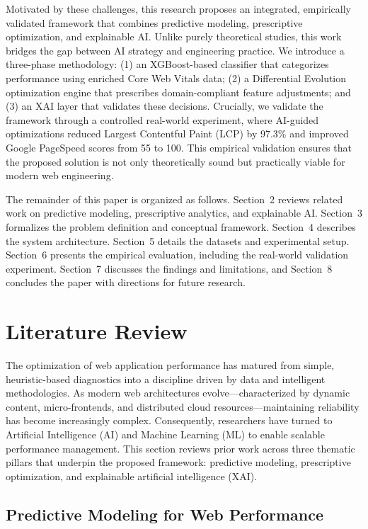 \documentclass[sn-nature]{sn-jnl}
\begin{document}
Motivated by these challenges, this research proposes an integrated, empirically validated framework that combines predictive modeling, prescriptive optimization, and explainable AI. Unlike purely theoretical studies, this work bridges the gap between AI strategy and engineering practice. We introduce a three-phase methodology: (1) an XGBoost-based classifier that categorizes performance using enriched Core Web Vitals data; (2) a Differential Evolution optimization engine that prescribes domain-compliant feature adjustments; and (3) an XAI layer that validates these decisions. Crucially, we validate the framework through a controlled real-world experiment, where AI-guided optimizations reduced Largest Contentful Paint (LCP) by 97.3\% and improved Google PageSpeed scores from 55 to 100. This empirical validation ensures that the proposed solution is not only theoretically sound but practically viable for modern web engineering.

The remainder of this paper is organized as follows. Section~2 reviews related work on predictive modeling, prescriptive analytics, and explainable AI. Section~3 formalizes the problem definition and conceptual framework. Section~4 describes the system architecture. Section~5 details the datasets and experimental setup. Section~6 presents the empirical evaluation, including the real-world validation experiment. Section~7 discusses the findings and limitations, and Section~8 concludes the paper with directions for future research.


\section{Literature Review}\label{sec2}

The optimization of web application performance has matured from simple, heuristic-based diagnostics into a discipline driven by data and intelligent methodologies. As modern web architectures evolve—characterized by dynamic content, micro-frontends, and distributed cloud resources—maintaining reliability has become increasingly complex. Consequently, researchers have turned to Artificial Intelligence (AI) and Machine Learning (ML) to enable scalable performance management. This section reviews prior work across three thematic pillars that underpin the proposed framework: predictive modeling, prescriptive optimization, and explainable artificial intelligence (XAI).

\subsection{Predictive Modeling for Web Performance}
\end{document}
